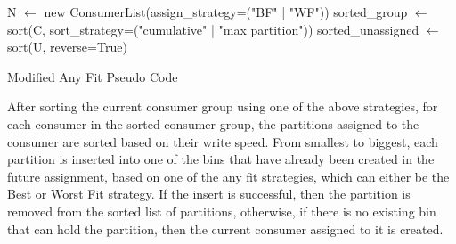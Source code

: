 \IncMargin{1em} 
\begin{algorithm}[htb!]
    \BlankLine 
    N $\leftarrow$ new ConsumerList(assign\_strategy=("BF" | "WF"))\; 
    sorted\_group $\leftarrow$ sort(C, sort\_strategy=("cumulative" | "max partition"))\; 
    sorted\_unassigned $\leftarrow$ sort(U, reverse=True)\; 
\caption{Modified Any Fit Pseudo Code}
\label{algo:MBPP} 
\end{algorithm}
\DecMargin{1em}

After sorting the current consumer group using one of the above strategies, for
each consumer in the sorted consumer group, the partitions assigned to the
consumer are sorted based on their write speed. From smallest to biggest, each
partition is inserted into one of the bins that have already been created in the
future assignment, based on one of the any fit strategies, which can either be
the Best or Worst Fit strategy. If the insert is successful, then the partition
is removed from the sorted list of partitions, otherwise, if there is no
existing bin that can hold the partition, then the current consumer assigned to
it is created. 

